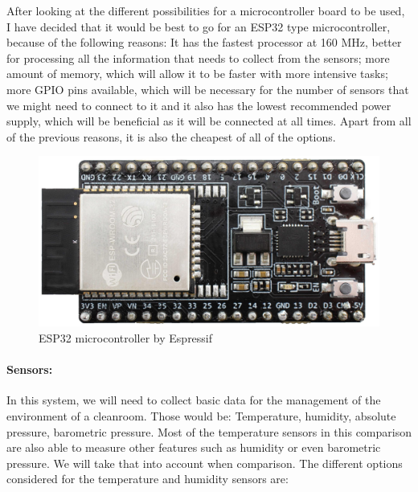 \documentclass[12pt]{article}
\begin{document}
After looking at the different possibilities for a microcontroller board to be used, I have decided that it would be best to go for an ESP32 type microcontroller, because of the following reasons: It has the fastest processor at 160 MHz, better for processing all the information that needs to collect from the sensors; more amount of memory, which will allow it to be faster with more intensive tasks; more GPIO pins available, which will be necessary for the number of sensors that we might need to connect to it and it also has the lowest recommended power supply, which will be beneficial as it will be connected at all times. Apart from all of the previous reasons, it is also the cheapest of all of the options.

\begin{figure}[h]
\label{fig:esp32}
\includegraphics[scale=0.06]{esp32-devkitc-v4-front}
\centering
\caption{ESP32 microcontroller by Espressif}
\end{figure}

\paragraph*{Sensors:}
In this system, we will need to collect basic data for the management of the environment of a cleanroom. Those would be: Temperature, humidity, absolute pressure, barometric pressure. Most of the temperature sensors in this comparison are also able to measure other features such as humidity or even barometric pressure. We will take that into account when comparison. The different options considered for the temperature and humidity sensors are:
\end{document}
